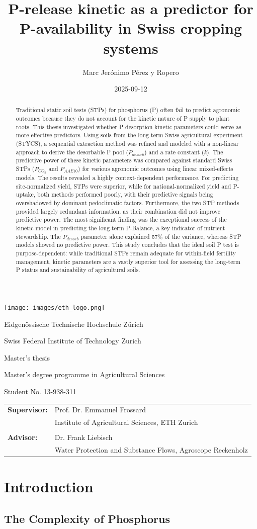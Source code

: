 \documentclass[
  a4paper,
]{article}
\title{P-release kinetic as a predictor for P-availability in Swiss
cropping systems}
\author{Marc Jerónimo Pérez y Ropero}
\date{2025-09-12}
\makeatletter
\renewcommand{\maketitle}{%
  \begin{titlepage}
    \thispagestyle{empty}
    \centering
    
    \vspace*{1cm}
    \texttt{[image: images/eth\_logo.png]}
    
    \vspace{2cm}
    {\Large Eidgenössische Technische Hochschule Zürich \par}
    {\Large Swiss Federal Institute of Technology Zurich \par}
    
    \vspace{2.5cm}
    {\Large Master's thesis\par}
    \vspace{0.5cm}
    {\large Master's degree programme in Agricultural Sciences\par}
    
    \vfill
    {\huge \bfseries \@title \par}
    
    \vfill
    {\Large \@author \par}
    {\large Student No. 13-938-311 \par}
    
    \vspace{2cm}
    \begin{tabular}{ll}
      \bfseries Supervisor: & Prof. Dr. Emmanuel Frossard \\
      & Institute of Agricultural Sciences, ETH Zurich \\
      \\
      \bfseries Advisor: & Dr. Frank Liebisch \\
      & Water Protection and Substance Flows, Agroscope Reckenholz \\
    \end{tabular}
    
    \vfill
    {\large \@date \par}
  \end{titlepage}
}
\makeatother
\begin{document}
\maketitle
\begin{abstract}
Traditional static soil tests (STPs) for phosphorus (P) often fail to
predict agronomic outcomes because they do not account for the kinetic
nature of P supply to plant roots. This thesis investigated whether P
desorption kinetic parameters could serve as more effective predictors.
Using soils from the long-term Swiss agricultural experiment (STYCS), a
sequential extraction method was refined and modeled with a non-linear
approach to derive the desorbable P pool (\(P_{desorb}\)) and a rate
constant (\emph{k}). The predictive power of these kinetic parameters
was compared against standard Swiss STPs (\(P_{CO_2}\) and
\(P_{AAE10}\)) for various agronomic outcomes using linear mixed-effects
models. The results revealed a highly context-dependent performance. For
predicting site-normalized yield, STPs were superior, while for
national-normalized yield and P-uptake, both methods performed poorly,
with their predictive signals being overshadowed by dominant
pedoclimatic factors. Furthermore, the two STP methods provided largely
redundant information, as their combination did not improve predictive
power. The most significant finding was the exceptional success of the
kinetic model in predicting the long-term P-Balance, a key indicator of
nutrient stewardship. The \(P_{desorb}\) parameter alone explained 57\%
of the variance, whereas STP models showed no predictive power. This
study concludes that the ideal soil P test is purpose-dependent: while
traditional STPs remain adequate for within-field fertility management,
kinetic parameters are a vastly superior tool for assessing the
long-term P status and sustainability of agricultural soils.
\end{abstract}

\cleardoublepage
\tableofcontents
\cleardoublepage 
\pagestyle{fancy}


\section{Introduction}\label{introduction}

\subsection{The Complexity of
Phosphorus}\label{the-complexity-of-phosphorus}
\end{document}
